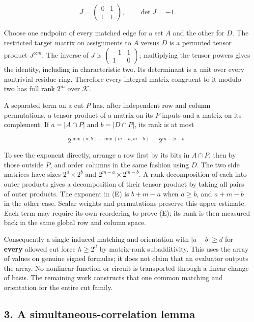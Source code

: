 \documentclass[
  11pt,
]{article}
\begin{document}
\[
J=\begin{pmatrix}0&1\\1&1\end{pmatrix},\qquad\det J=-1.
\]

Choose one endpoint of every matched edge for a set \(A\) and the other
for \(D\). The restricted target matrix on assignments to \(A\) versus
\(D\) is a permuted tensor product \(J^{\otimes m}\). The inverse of \(J\) is
\(\left(\begin{smallmatrix}-1&1\\1&0\end{smallmatrix}\right)\); multiplying the
tensor powers gives the identity, including in characteristic two.
Its determinant is a unit over every nontrivial residue ring. Therefore every
integral matrix congruent to it modulo two has full rank \(2^m\) over
\(\mathcal K\).

A separated term on a cut \(P\) has, after independent row and column
permutations, a tensor product of a matrix on its \(P\) inputs and a
matrix on its complement. If \(a=|A\cap P|\) and \(b=|D\cap P|\), its
rank is at most

\[
2^{\min(a,b)+\min(m-a,m-b)}=2^{m-|a-b|}.
\tag{E}
\]

To see the exponent directly, arrange a row first by its bits in
\(A\cap P\), then by those outside \(P\), and order columns in the same
fashion using \(D\). The two side matrices have sizes \(2^a\times2^b\)
and \(2^{m-a}\times2^{m-b}\). A rank decomposition of each into
outer products gives a decomposition of their tensor product by taking
all pairs of outer products. The exponent in (E) is \(b+m-a\) when
\(a\ge b\), and \(a+m-b\) in the other case. Scalar weights and
permutations preserve this upper estimate. Each term may require its
own reordering to prove (E); its rank is then measured back in the same
global row and column space.

Consequently a single induced matching and orientation with
\(|a-b|\ge d\) for \textbf{every} allowed cut force \(h\ge2^d\) by
matrix-rank subadditivity. This uses the array of values on genuine
signed formulas; it does not claim that an evaluator outputs the array.
No nonlinear function or circuit is transported through a linear change
of basis. The remaining work constructs that one common matching and
orientation for the entire cut family.

\subsection{3. A simultaneous-correlation
lemma}\label{a-simultaneous-correlation-lemma}
\end{document}
